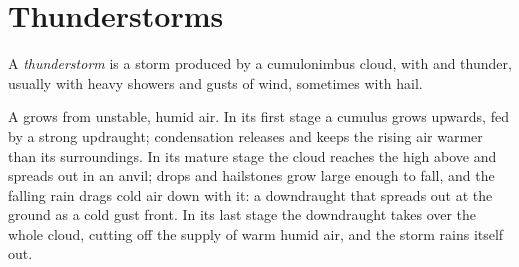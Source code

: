 \section{Thunderstorms}

\begin{definition}[Thunderstorm]\label{def:g10:storms-and-cyclones:thunderstorm}
A \emph{thunderstorm} is a storm produced by a
cumulonimbus cloud, with  and thunder, usually with heavy showers
and gusts of wind, sometimes with hail.
\end{definition}

A  grows from unstable, humid air. In its first stage a cumulus
grows upwards, fed by a strong updraught; condensation releases 
and keeps the rising air warmer than its surroundings. In its mature stage
the cloud reaches the  high above and spreads out in an anvil;
drops and hailstones grow large enough to fall, and the falling rain drags
cold air down with it: a downdraught that spreads out at the ground as a
cold gust front. In its last stage the downdraught takes over the whole
cloud, cutting off the supply of warm humid air, and the storm rains itself
out.


